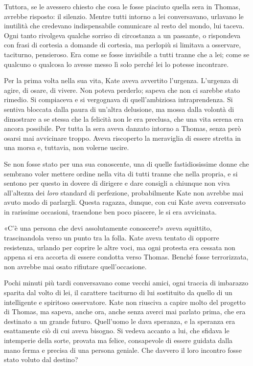 \documentclass[a4paper,oneside,10pt]{memoir}
\begin{document}
Tuttora, se le avessero chiesto che cosa le fosse piaciuto quella sera in Thomas, avrebbe risposto: il silenzio. Mentre
tutti intorno a lei conversavano, urlavano le inutilità che credevano indispensabile comunicare al resto del mondo, lui
taceva. Ogni tanto rivolgeva qualche sorriso di circostanza a un passante, o rispondeva con frasi di cortesia a
domande di cortesia, ma perlopiù si limitava a osservare, taciturno, pensieroso. Era come se fosse invisibile a tutti
tranne che a lei; come se qualcuno o qualcosa lo avesse messo lì solo perché lei lo potesse incontrare.

Per la prima volta nella sua vita, Kate aveva avvertito l'urgenza. L'urgenza di agire, di osare, di vivere. Non poteva
perderlo; sapeva che non ci sarebbe stato rimedio. Si compiaceva e si vergognava di quell'ambiziosa intraprendenza. Si
sentiva bloccata dalla paura di un'altra delusione, ma mossa dalla volontà di dimostrare a se stessa che la felicità non
le era preclusa, che una vita serena era ancora possibile. Per tutta la sera aveva danzato intorno a Thomas, senza però
osarsi mai avvicinare troppo. Aveva riscoperto la meraviglia di essere stretta in una morsa e, tuttavia, non volerne
uscire.

Se non fosse stato per una sua conoscente, una di quelle fastidiosissime donne che sembrano voler mettere ordine nella
vita di tutti tranne che nella propria, e si sentono per questo in dovere di dirigere e dare consigli a chiunque non
viva all'altezza dei \emph{loro} standard di perfezione, probabilmente Kate non avrebbe mai avuto modo di parlargli.
Questa ragazza, dunque, con cui Kate aveva conversato in rarissime occasioni, traendone ben poco piacere, le si
era avvicinata.

«C'è una persona che devi assolutamente conoscere!» aveva squittito, trascinandola verso un punto tra la folla. Kate
aveva tentato di opporre resistenza, urlando per coprire le altre voci, ma ogni protesta era cessata non appena si era
accorta di essere condotta verso Thomas. Benché fosse terrorizzata, non avrebbe mai osato rifiutare quell'occasione.

Pochi minuti più tardi conversavano come vecchi amici, ogni traccia di imbarazzo sparita dal volto di lei, il carattere
taciturno di lui sostituito da quello di un intelligente e spiritoso osservatore. Kate non riusciva a capire molto del
progetto di Thomas, ma sapeva, anche ora, anche senza averci mai parlato prima, che era destinato a un grande futuro.
Quell'uomo le dava speranza, e la speranza era esattamente ciò di cui aveva bisogno. Si vedeva accanto a lui, che
sfidava le intemperie della sorte, provata ma felice, consapevole di essere guidata dalla mano ferma e precisa di una
persona geniale. Che davvero il loro incontro fosse stato voluto dal destino?
\end{document}
